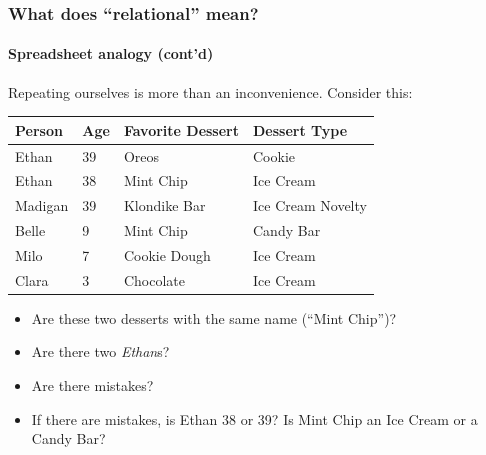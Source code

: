 \documentclass[aspectratio=169]{beamer}
\begin{document}
\begin{frame}
  \frametitle{What does ``relational'' mean?}
  \framesubtitle{Spreadsheet analogy (cont'd)}

  Repeating ourselves is more than an inconvenience. Consider this:

  \begin{table}[]
    \small
    \begin{tabular}{@{}llll@{}}
      \toprule
      Person  & Age & Favorite Dessert & Dessert Type      \\ \midrule
      Ethan   & 39  & Oreos            & Cookie            \\
      Ethan   & 38  & Mint Chip        & Ice Cream         \\
      Madigan & 39  & Klondike Bar     & Ice Cream Novelty \\
      Belle   & 9   & Mint Chip        & Candy Bar         \\
      Milo    & 7   & Cookie Dough     & Ice Cream         \\
      Clara   & 3   & Chocolate        & Ice Cream         \\ \bottomrule
    \end{tabular}
  \end{table}


  \begin{itemize}
    \item Are these two desserts with the same name (``Mint Chip'')?
    \item Are there two \textit{Ethan}s?
    \item Are there mistakes?
    \item If there are mistakes, is Ethan 38 or 39? Is Mint Chip an Ice Cream
          or a Candy Bar?
  \end{itemize}
\end{frame}
\end{document}
